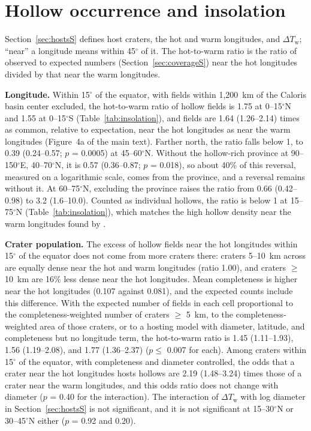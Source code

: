 \documentclass{planetary}
\begin{document}
\clearpage

\section{Hollow occurrence and insolation}
\label{sec:insolationS}

Section~\ref{sec:hostsS} defines host craters, the hot and warm longitudes, and $\Delta T_\mathrm{w}$; ``near'' a longitude means within 45$^\circ$ of it. The hot-to-warm ratio is the ratio of observed to expected numbers (Section~\ref{sec:coverageS}) near the hot longitudes divided by that near the warm longitudes.

\textbf{Longitude.} Within 15$^\circ$ of the equator, with fields within 1,200~km of the Caloris basin center excluded, the hot-to-warm ratio of hollow fields is 1.75 at 0--15$^\circ$N and 1.55 at 0--15$^\circ$S (Table~\ref{tab:insolation}), and fields are 1.64 (1.26--2.14) times as common, relative to expectation, near the hot longitudes as near the warm longitudes (Figure~4a of the main text). Farther north, the ratio falls below 1, to 0.39 (0.24--0.57; $p$ = 0.0005) at 45--60$^\circ$N. Without the hollow-rich province at 90--150$^\circ$E, 40--70$^\circ$N, it is 0.57 (0.36--0.87; $p$ = 0.018), so about 40\% of this reversal, measured on a logarithmic scale, comes from the province, and a reversal remains without it. At 60--75$^\circ$N, excluding the province raises the ratio from 0.66 (0.42--0.98) to 3.2 (1.6--10.0). Counted as individual hollows, the ratio is below 1 at 15--75$^\circ$N (Table~\ref{tab:insolation}), which matches the high hollow density near the warm longitudes found by \textcite{bickel2025}.

\textbf{Crater population.} The excess of hollow fields near the hot longitudes within 15$^\circ$ of the equator does not come from more craters there: craters 5--10~km across are equally dense near the hot and warm longitudes (ratio 1.00), and craters $\geq$ 10~km are 16\% less dense near the hot longitudes. Mean completeness is higher near the hot longitudes (0.107 against 0.081), and the expected counts include this difference. With the expected number of fields in each cell proportional to the completeness-weighted number of craters $\geq$ 5~km, to the completeness-weighted area of those craters, or to a hosting model with diameter, latitude, and completeness but no longitude term, the hot-to-warm ratio is 1.45 (1.11--1.93), 1.56 (1.19--2.08), and 1.77 (1.36--2.37) ($p \leq$ 0.007 for each). Among craters within 15$^\circ$ of the equator, with completeness and diameter controlled, the odds that a crater near the hot longitudes hosts hollows are 2.19 (1.48--3.24) times those of a crater near the warm longitudes, and this odds ratio does not change with diameter ($p$ = 0.40 for the interaction). The interaction of $\Delta T_\mathrm{w}$ with log diameter in Section~\ref{sec:hostsS} is not significant, and it is not significant at 15--30$^\circ$N or 30--45$^\circ$N either ($p$ = 0.92 and 0.20).
\end{document}
